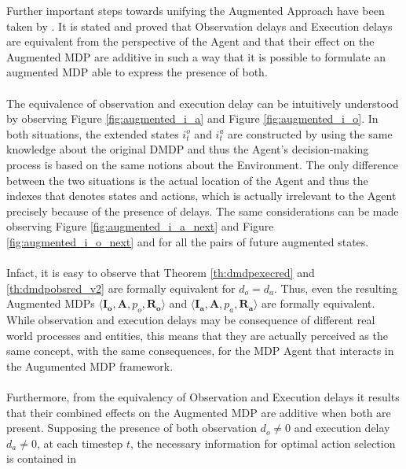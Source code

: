                 Further important steps towards unifying the Augmented Approach have been taken by . It is stated and proved that Observation delays and Execution delays are equivalent from the perspective of the Agent and that their effect on the Augmented MDP are additive in such a way that it is possible to formulate an augmented MDP able to express the presence of both.
                \\\\
                The equivalence of observation and execution delay can be intuitively understood by observing Figure \ref{fig:augmented_i_a} and Figure \ref{fig:augmented_i_o}. In both situations, the extended states $i^o_t$ and $i^a_t$ are constructed by using the same knowledge about the original DMDP and thus the Agent's decision-making process is based on the same notions about the Environment. The only difference between the two situations is the actual location of the Agent and thus the indexes that denotes states and actions, which is actually irrelevant to the Agent precisely because of the presence of delays. The same considerations can be made observing Figure \ref{fig:augmented_i_a_next} and Figure \ref{fig:augmented_i_o_next} and for all the pairs of future augmented states.
                \\\\
                Infact, it is easy to observe that Theorem \ref{th:dmdpexecred} and \ref{th:dmdpobsred_v2} are formally equivalent for $d_o = d_a$. Thus, even the resulting Augmented MDPs $\langle \mathbf{I_o}, \mathbf{A}, p_o, \mathbf{R_o} \rangle$ and $\langle \mathbf{I_a}, \mathbf{A}, p_a, \mathbf{R_a} \rangle$ are formally equivalent. While observation and execution delays may be consequence of different real world processes and entities, this means that they are actually perceived as the same concept, with the same consequences, for the MDP Agent that interacts in the Augumented MDP framework.
                \\\\
                Furthermore, from the equivalency of Observation and Execution delays it results that their combined effects on the Augmented MDP are additive when both are present. Supposing the presence of both observation $d_o \neq 0$ and execution delay $d_a \neq 0$, at each timestep $t$, the necessary information for optimal action selection is contained in 
